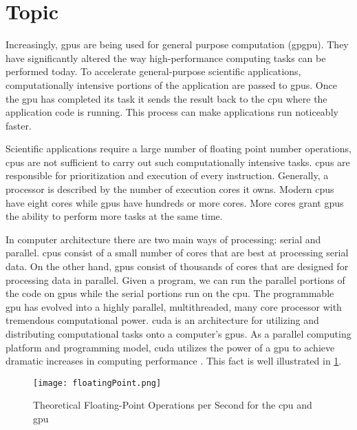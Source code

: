 \section{Topic}

Increasingly, \Glspl{gpu} are being used for general purpose computation
(\gls{gpgpu}). They have significantly altered the way high-performance
computing tasks can be performed today. To accelerate general-purpose
scientific applications, computationally intensive portions of the application
are passed to \glspl{gpu}. Once the \gls{gpu} has completed its task it sends
the result back to the \Gls{cpu} where the application code is running. This
process can make applications run noticeably faster.

Scientific applications require a large number of floating point number
operations, \Glspl{cpu} are not sufficient to carry out such computationally
intensive tasks. \glspl{cpu} are responsible for prioritization and execution
of every instruction. Generally, a processor is described by the number of
execution cores it owns. Modern \glspl{cpu} have eight cores while \Glspl{gpu}
have hundreds or more cores. More cores grant \glspl{gpu} the ability to
perform more tasks at the same time.

In computer architecture there are two main ways of processing: serial and
parallel. \Glspl{cpu} consist of a small number of cores that are best at
processing serial data. On the other hand, \glspl{gpu} consist of thousands of
cores that are designed for processing data in parallel. Given a program, we
can run the parallel portions of the code on \glspl{gpu} while the serial
portions run on the \gls{cpu}\@. The programmable \gls{gpu} has evolved into a
highly parallel, multithreaded, many core processor with tremendous
computational power. \Gls{cuda} is an architecture for utilizing and
distributing computational tasks onto a computer's \glspl{gpu}. As a parallel
computing platform and programming model, \gls{cuda} utilizes the power of a
\gls{gpu} to achieve dramatic increases in computing performance
\cite{website:cudaCProgrammingGuide}. This fact is well illustrated in
\cref{fig:flops_gpu_vs_cpu}.

\begin{figure}[htb]
\centering
\texttt{[image: floatingPoint.png]}
\caption{Theoretical Floating-Point Operations per Second for the \gls{cpu} and
         \gls{gpu} \cite{website:cudaCProgrammingGuide}}
\label{fig:flops_gpu_vs_cpu}
\end{figure}

